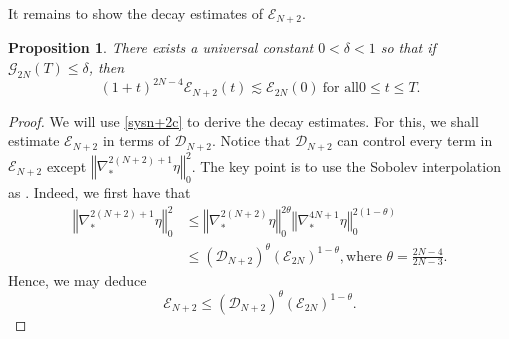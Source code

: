 \documentclass[a4paper,reqno,11pt]{amsart}
\numberwithin{equation}{section}
\providecommand{\norm}[1]{\left\Vert#1\right\Vert}
\providecommand{\ns}[1]{\norm{#1}^2}
\providecommand{\norm}[1]{\left\Vert#1\right\Vert}
\newtheorem{prop}[lem]{Proposition}
\begin{document}
It remains to show the decay estimates of
$\mathcal{E}_{N+2} $.

\begin{prop} \label{decaylmc}
There exists a universal constant $0<\delta<1$ so that if $\mathcal{G}_{2N}(T)\le\delta$, then
\begin{equation}\label{n+2c}
(1+t)^{2N-4} \mathcal{E}_{N+2} (t)\lesssim
\mathcal{E}_{2N} (0)  \ \text{for all
}0\le t\le T.
\end{equation}
\end{prop}
\begin{proof}
We will use \eqref{sysn+2c} to derive the decay estimates. For this, we shall estimate $\mathcal{E}_{N+2} $ in terms of $\mathcal{D}_{N+2} $. Notice that ${\mathcal{D}}_{N+2} $ can control every term in ${\mathcal{E}}_{N+2} $ except $ \ns{\nabla_\ast^{2(N+2)+1}\eta}_{0}$. The key point is to use the Sobolev interpolation as \cite{RG,GT_per}. Indeed, we first have that
\begin{equation} \label{intep0c}
\begin{split}
\ns{\nabla_\ast^{2(N+2)+1}\eta}_{0}&\le  \norm{\nabla_\ast^{2(N+2)}\eta}_{0} ^{2\theta} \norm{\nabla_\ast^{4N+1}\eta}_{0}^{2(1-\theta)}
\\&\le ( {\mathcal{D}_{N+2} })^\theta({\mathcal{E}_{2N} })^{1-\theta},\text{
where }\theta=\frac{2N-4}{2N-3}.
\end{split}
\end{equation}
Hence, we may deduce
\begin{equation} \label{intepc}
{\mathcal{E}}_{N+2} \le({\mathcal{D}}_{N+2} )^\theta({\mathcal{E}}_{2N} )^{1-\theta}.
\end{equation}


\end{proof}
\end{document}

